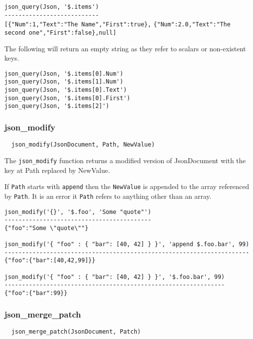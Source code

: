 \verb`json_query(Json, '$.items')`\\
\verb`---------------------------`\\
\verb`[{"Num":1,"Text":"The Name","First":true},`\split
\verb`{"Num":2.0,"Text":"The second one","First":false},null]`

The following will return an empty string as they refer to scalars
or non-existent keys.
\begin{verbatim}
json_query(Json, '$.items[0].Num')
json_query(Json, '$.items[1].Num')
json_query(Json, '$.items[0].Text')
json_query(Json, '$.items[0].First')
json_query(Json, '$.items[2]')
\end{verbatim}


\subsubsection{json\_modify}

\begin{verbatim}
  json_modify(JsonDocument, Path, NewValue)
\end{verbatim}

The \verb`json_modify` function returns a modified version of JsonDocument
with the key at Path replaced by NewValue.

If \verb`Path` starts with {\tt append\textvisiblespace } then the {\tt NewValue} is appended to the
array referenced by {\tt Path}.  It is an error it {\tt Path} refers to anything
other than an array.

\begin{verbatim}
json_modify('{}', '$.foo', 'Some "quote"')
------------------------------------------
{"foo":"Some \"quote\""}

json_modify('{ "foo" : { "bar": [40, 42] } }', 'append $.foo.bar', 99)
----------------------------------------------------------------------
{"foo":{"bar":[40,42,99]}}

json_modify('{ "foo" : { "bar": [40, 42] } }', '$.foo.bar', 99)
---------------------------------------------------------------
{"foo":{"bar":99}}
\end{verbatim}
\subsubsection{json\_merge\_patch}

\begin{verbatim}
  json_merge_patch(JsonDocument, Patch)
\end{verbatim}


